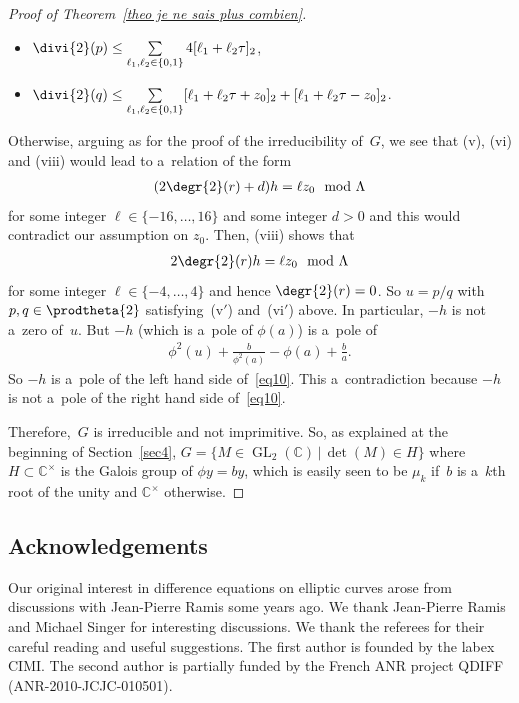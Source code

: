 \documentclass[pdftex]{sigma}
\numberwithin{equation}{section}
\begin{document}
\begin{proof}[Proof of Theorem~\ref{theo je ne sais plus combien}]
\begin{itemize}
\itemsep=0pt
\item[(v$'$)] $\divi{2} (p) \leq \sum\limits_{\ell_{1},\ell_{2} \in \{0,1\}}4[\ell_{1}+\ell_{2}\tau]_{2}$,
\item[(vi$'$)] $\divi{2} (q) \leq \sum\limits_{\ell_{1},\ell_{2} \in
\{0,1\}}[\ell_{1}+\ell_{2}\tau+z_{0}]_{2}+[\ell_{1}+\ell_{2}\tau-z_{0}]_{2}$.
\end{itemize}
Otherwise, arguing as for the proof of the irreducibility of~$G$, we see that (v), (vi) and (viii) would lead to
a~relation of the form
\begin{gather*}
(2\degr{2} (r) + d)h = \ell z_{0} \mod \Lambda
\end{gather*}
for some integer $\ell \in \{-16,\dots,16\}$ and some integer $d>0$ and this would contradict our assumption on $z_{0}$.
Then, (viii) shows that
\begin{gather*}
2\degr{2} (r) h = \ell z_{0} \mod \Lambda
\end{gather*}
for some integer $\ell \in \{-4,\dots,4\}$ and hence $\degr{2} (r)=0$.
So $u=p/q$ with $p,q \in \prodtheta{2}$ satis\-fying~(v$'$) and~(vi$'$) above.
In particular, $-h$ is not a~zero of~$u$.
But $-h$ (which is a~pole of $\phi(a)$) is a~pole of
\begin{gather*}
\phi^{2}(u)+\frac{b}{\phi^{2}(a)}-\phi(a)+\frac{b}{a}.
\end{gather*}
So $-h$ is a~pole of the left hand side of~\eqref{eq10}.
This a~contradiction because $-h$ is not a~pole of the right hand side of~\eqref{eq10}.

Therefore,~$G$ is irreducible and not imprimitive.
So, as explained at the beginning of Section~\ref{sec4}, $G = \{M \in \operatorname{GL}_{2}(\mathbb C) \, \vert \, \det
(M) \in H\}$ where~$H \subset \mathbb C^{\times}$ is the Galois group of $\phi y = b y$, which is easily seen to be
$\mu_{k}$ if~$b$ is a~$k$th root of the unity and $\mathbb C^{\times}$ otherwise.
\end{proof}

\subsection*{Acknowledgements}

Our original interest in dif\/ference equations on elliptic curves arose from discussions with Jean-Pierre Ramis some
years ago.
We thank Jean-Pierre Ramis and Michael Singer for interesting discussions.
We thank the referees for their careful reading and useful suggestions.
The f\/irst author is founded by the labex CIMI.
The second author is partially funded by the French ANR project QDIFF (ANR-2010-JCJC-010501).
\end{document}

